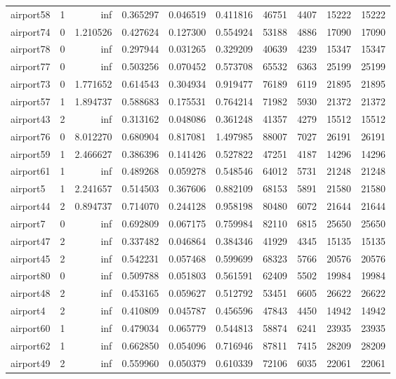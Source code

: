 \documentclass[../../../thesis.tex]{subfiles}
\begin{document}
\begin{longtable}{|l|r|r|r|r|r|r|r|r|r|}
airport58 & 1 & inf & 0.365297 & 0.046519 & 0.411816 & 46751 & 4407 & 15222 & 15222 \\
airport74 & 0 & 1.210526 & 0.427624 & 0.127300 & 0.554924 & 53188 & 4886 & 17090 & 17090 \\
airport78 & 0 & inf & 0.297944 & 0.031265 & 0.329209 & 40639 & 4239 & 15347 & 15347 \\
airport77 & 0 & inf & 0.503256 & 0.070452 & 0.573708 & 65532 & 6363 & 25199 & 25199 \\
airport73 & 0 & 1.771652 & 0.614543 & 0.304934 & 0.919477 & 76189 & 6119 & 21895 & 21895 \\
airport57 & 1 & 1.894737 & 0.588683 & 0.175531 & 0.764214 & 71982 & 5930 & 21372 & 21372 \\
airport43 & 2 & inf & 0.313162 & 0.048086 & 0.361248 & 41357 & 4279 & 15512 & 15512 \\
airport76 & 0 & 8.012270 & 0.680904 & 0.817081 & 1.497985 & 88007 & 7027 & 26191 & 26191 \\
airport59 & 1 & 2.466627 & 0.386396 & 0.141426 & 0.527822 & 47251 & 4187 & 14296 & 14296 \\
airport61 & 1 & inf & 0.489268 & 0.059278 & 0.548546 & 64012 & 5731 & 21248 & 21248 \\
airport5 & 1 & 2.241657 & 0.514503 & 0.367606 & 0.882109 & 68153 & 5891 & 21580 & 21580 \\
airport44 & 2 & 0.894737 & 0.714070 & 0.244128 & 0.958198 & 80480 & 6072 & 21644 & 21644 \\
airport7 & 0 & inf & 0.692809 & 0.067175 & 0.759984 & 82110 & 6815 & 25650 & 25650 \\
airport47 & 2 & inf & 0.337482 & 0.046864 & 0.384346 & 41929 & 4345 & 15135 & 15135 \\
airport45 & 2 & inf & 0.542231 & 0.057468 & 0.599699 & 68323 & 5766 & 20576 & 20576 \\
airport80 & 0 & inf & 0.509788 & 0.051803 & 0.561591 & 62409 & 5502 & 19984 & 19984 \\
airport48 & 2 & inf & 0.453165 & 0.059627 & 0.512792 & 53451 & 6605 & 26622 & 26622 \\
airport4 & 2 & inf & 0.410809 & 0.045787 & 0.456596 & 47843 & 4450 & 14942 & 14942 \\
airport60 & 1 & inf & 0.479034 & 0.065779 & 0.544813 & 58874 & 6241 & 23935 & 23935 \\
airport62 & 1 & inf & 0.662850 & 0.054096 & 0.716946 & 87811 & 7415 & 28209 & 28209 \\
airport49 & 2 & inf & 0.559960 & 0.050379 & 0.610339 & 72106 & 6035 & 22061 & 22061 \\

\end{longtable}
\end{document}
